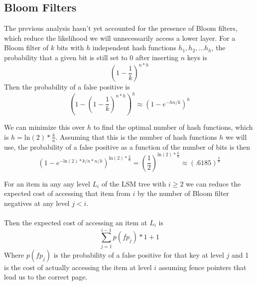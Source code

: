 \documentclass{sig-alternate-05-2015}
\begin{document}
%
%

\subsection{Bloom Filters}

The previous analysis hasn't yet accounted for the presence of Bloom filters, which reduce the likelihood we will unnecessarily access a lower layer. For a Bloom filter of $k$ bits with $h$ independent hash functions $h_1, h_2,...h_h$, the probability that a given bit is still set to 0 after inserting $n$ keys is 
$$
(1 - \frac{1}{k})^{n*h}
$$
Then the probability of a false positive is 
$$
(1- (1 - \frac{1}{k})^{n*h})^h \approx (1 - e^{-hn/k})^h
$$

We can minimize this over $h$ to find the optimal number of hash functions, which is $h = \mathrm{ln}(2) * \frac{k}{n}$. Assuming that this is the number of hash functions $h$ we will use, the probability of a false positive as a function of the number of bits is then 
$$
(1 - e^{-\mathrm{ln}(2)*k/n*n/k})^{\mathrm{ln}(2) * \frac{k}{n}} = (\frac{1}{2}) ^ {\mathrm{ln}(2) * \frac{k}{n}} \approx (.6185) ^  {\frac{k}{n}}
$$

For an item in any any level $L_i$ of the LSM tree with $i \geq 2$ we can reduce the expected cost of accessing that item from $i$ by the number of Bloom filter negatives at any level $j<i$. \\ \\
Then the expected cost of accessing an item at $L_i$ is  $$\sum_{j=1}^{i-1} p(fp_j) * 1 + 1$$
Where $p(fp_j)$ is the probability of a false positive for that key at level $j$ and 1 is the cost of actually accessing the item at level $i$ assuming fence pointers that lead us to the correct page.
\end{document}
